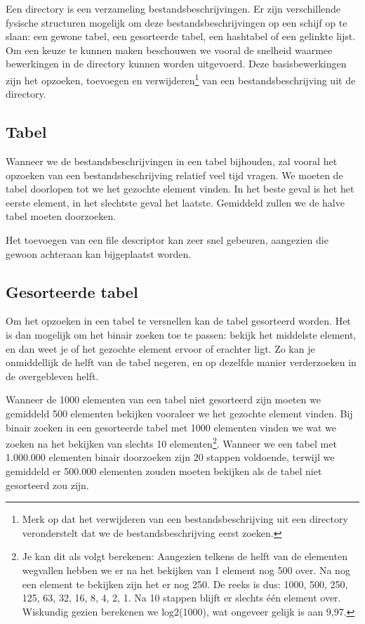 Een directory is een verzameling bestandsbeschrijvingen. Er zijn
verschillende fysische structuren mogelijk om deze
bestandsbeschrijvingen op een schijf op te slaan: een gewone tabel, een
gesorteerde tabel, een hashtabel of een gelinkte lijst. Om een keuze te
kunnen maken beschouwen we vooral de snelheid waarmee bewerkingen in de
directory kunnen worden uitgevoerd. Deze basisbewerkingen zijn het
opzoeken, toevoegen en verwijderen\footnote{Merk op dat het verwijderen van een
bestandsbeschrijving uit een directory veronderstelt dat we de
bestandsbeschrijving eerst zoeken.} van een bestandsbeschrijving uit de
directory.

\subsection{Tabel}

Wanneer we de bestandsbeschrijvingen in een tabel bijhouden, zal
vooral het opzoeken van een bestandsbeschrijving relatief veel tijd
vragen. We moeten de tabel doorlopen tot we het gezochte element
vinden. In het beste geval is het het eerste element, in het slechtste
geval het laatste. Gemiddeld zullen we de halve tabel moeten
doorzoeken.

Het toevoegen van een file descriptor kan zeer snel gebeuren,
aangezien die gewoon achteraan kan bijgeplaatst worden.

\subsection{Gesorteerde tabel}

Om het opzoeken in een tabel te versnellen kan de tabel
gesorteerd worden. Het is dan mogelijk om het binair zoeken toe te
passen: bekijk het middelste element, en dan weet je of het gezochte
element ervoor of erachter ligt. Zo kan je onmiddellijk de helft van
de tabel negeren, en op dezelfde manier verderzoeken in de
overgebleven helft.

Wanneer de 1000 elementen van een tabel niet gesorteerd zijn
moeten we gemiddeld 500 elementen bekijken vooraleer we het gezochte
element vinden. Bij binair zoeken in een gesorteerde tabel met 1000
elementen vinden we wat we zoeken na het bekijken van slechts 10
elementen\footnote{Je kan dit als volgt berekenen: Aangezien telkens de helft
van de elementen wegvallen hebben we er na het bekijken van 1 element nog 500
over. Na nog een element te bekijken zijn het er nog 250. De reeks is dus: 1000,
500, 250, 125, 63, 32, 16, 8, 4, 2, 1. Na 10 stappen blijft er slechts \'e\'en
element over. Wiskundig gezien berekenen we log2(1000), wat ongeveer gelijk is
aan 9,97.}. Wanneer we een tabel met 1.000.000 elementen binair doorzoeken zijn
20 stappen voldoende, terwijl we gemiddeld er 500.000 elementen zouden moeten
bekijken als de tabel niet gesorteerd zou zijn.

